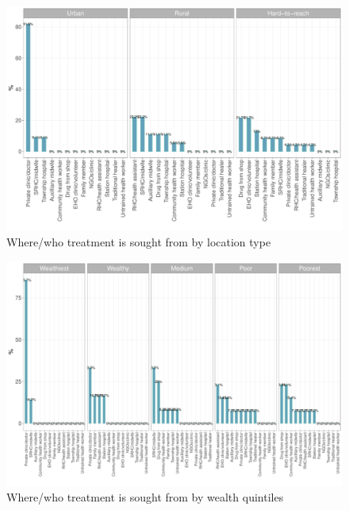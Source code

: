 \documentclass[12pt,a4paper]{article}
\begin{document}
\begin{figure}[H]

{\centering \includegraphics{kayinReport_files/figure-latex/diarrhoea5plot-1} 

}

\caption{Where/who treatment is sought from by location type}\label{fig:diarrhoea5plot}
\end{figure}

\begin{figure}[H]

{\centering \includegraphics{kayinReport_files/figure-latex/diarrhoea6plot-1} 

}

\caption{Where/who treatment is sought from by wealth quintiles}\label{fig:diarrhoea6plot}
\end{figure}
\end{document}
